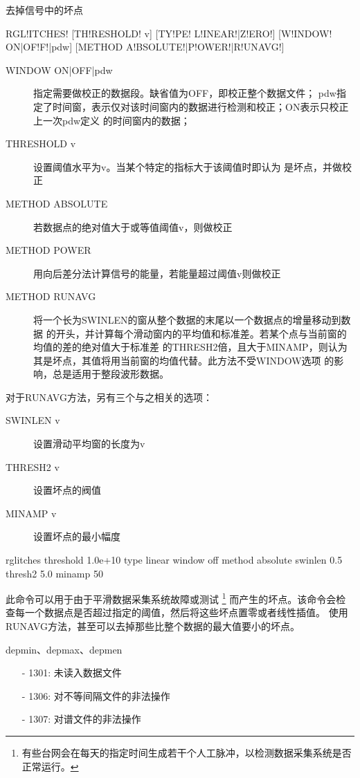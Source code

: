 \label{cmd:rglitches}

去掉信号中的坏点

\begin{SACSTX}
RGL!ITCHES! [TH!RESHOLD! v] [TY!PE! L!INEAR!|Z!ERO!] [W!INDOW! ON|OF!F!|pdw] 
    [METHOD A!BSOLUTE!|P!OWER!|R!UNAVG!]
\end{SACSTX}

\begin{description}
\item [WINDOW ON|OFF|pdw] 指定需要做校正的数据段。缺省值为OFF，即校正整个数据文件；
    pdw指定了时间窗，表示仅对该时间窗内的数据进行检测和校正；ON表示只校正上一次pdw定义
    的时间窗内的数据；
\item [THRESHOLD v] 设置阈值水平为v。当某个特定的指标大于该阈值时即认为
    是坏点，并做校正
\item [METHOD ABSOLUTE] 若数据点的绝对值大于或等值阈值v，则做校正
\item [METHOD POWER] 用向后差分法计算信号的能量，若能量超过阈值v则做校正
\item [METHOD RUNAVG] 将一个长为SWINLEN的窗从整个数据的末尾以一个数据点的增量移动到数据
    的开头，并计算每个滑动窗内的平均值和标准差。若某个点与当前窗的均值的差的绝对值大于标准差
    的THRESH2倍，且大于MINAMP，则认为其是坏点，其值将用当前窗的均值代替。此方法不受WINDOW选项
    的影响，总是适用于整段波形数据。
\end{description}
    
对于RUNAVG方法，另有三个与之相关的选项：
\begin{description}
\item [SWINLEN v] 设置滑动平均窗的长度为v
\item [THRESH2 v] 设置坏点的阀值
\item [MINAMP v] 设置坏点的最小幅度
\end{description} 

\begin{SACDFT}
rglitches threshold 1.0e+10 type linear window off method absolute 
    swinlen 0.5 thresh2 5.0 minamp 50
\end{SACDFT}

此命令可以用于由于平滑数据采集系统故障或测试
\footnote{有些台网会在每天的指定时间生成若干个人工脉冲，以检测数据采集系统是否正常运行。}
而产生的坏点。该命令会检查每一个数据点是否超过指定的阈值，然后将这些坏点置零或者线性插值。
使用RUNAVG方法，甚至可以去掉那些比整个数据的最大值要小的坏点。

depmin、depmax、depmen

\begin{itemize}
\item[-]1301: 未读入数据文件
\item[-]1306: 对不等间隔文件的非法操作
\item[-]1307: 对谱文件的非法操作
\end{itemize}
